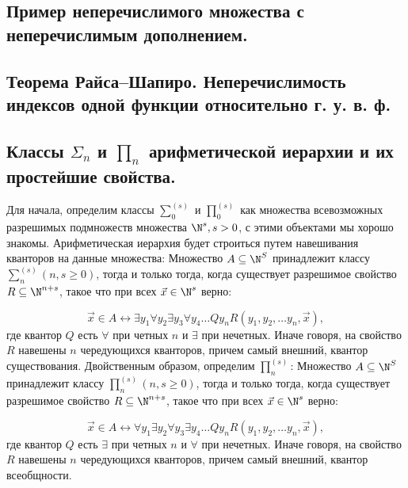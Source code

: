 \documentclass[a4paper, 10pt]{article}
\begin{document}
\subsection{Пример неперечислимого множества с неперечислимым дополнением.}

\subsection{Теорема Райса–Шапиро. Неперечислимость индексов одной функции относительно г. у. в. ф.}

\subsection{Классы $\Sigma_n$ и $\prod_n$ арифметической иерархии и их простейшие свойства.}

Для начала, определим классы $\sum_0^{(s)}$ и $\prod_0^{(s)}$ как множества всевозможных разрешимых подмножеств множества $\N^s, s > 0$, с этими объектами мы хорошо знакомы. Арифметическая иерархия будет строиться путем навешивания кванторов на данные множества:
Множество $A \subseteq \N^S$ принадлежит классу $\sum_n^{(s)} (n,s \geq 0)$, тогда и только тогда, когда существует разрешимое свойство $R \subseteq \N^{n+s}$, такое что при всех $\vec{x} \in \N^{s}$ верно:

$$ \vec{x} \in A \leftrightarrow \exists y_1 \forall y_2 \exists y_3 \forall y_4 \ldots Q y_n R(y_1, y_2, \ldots y_n, \vec{x}),$$
где квантор $Q$ есть $\forall$ при четных $n$ и $\exists$ при нечетных. Иначе говоря, на свойство $R$ навешены $n$ чередующихся кванторов, причем самый внешний, квантор существования.
Двойственным образом, определим $\prod_n^{(s)}$: Множество $A \subseteq \N^S$ принадлежит классу $\prod_n^{(s)} (n,s \geq 0)$, тогда и только тогда, когда существует разрешимое свойство $R \subseteq \N^{n+s}$, такое что при всех $\vec{x} \in \N^{s}$ верно:

$$ \vec{x} \in A \leftrightarrow \forall y_1 \exists y_2 \forall y_3 \exists y_4 \ldots Q y_n R(y_1, y_2, \ldots y_n, \vec{x}),$$
где квантор $Q$ есть $\exists$ при четных $n$ и $\forall$ при нечетных. Иначе говоря, на свойство $R$ навешены $n$ чередующихся кванторов, причем самый внешний, квантор всеобщности. 
\end{document}
